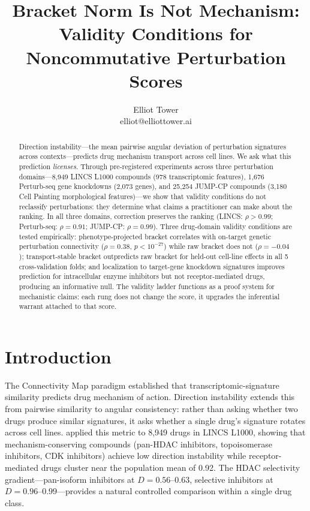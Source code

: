 \documentclass{article}
\title{Bracket Norm Is Not Mechanism:\\ Validity Conditions for Noncommutative Perturbation Scores}
\author{\name Elliot Tower \\
      \email elliot@elliottower.ai}
\begin{document}
\maketitle

\begin{abstract}
Direction instability---the mean pairwise angular deviation of perturbation
signatures across contexts---predicts drug mechanism transport across cell
lines. We ask what this prediction \emph{licenses}. Through pre-registered
experiments across three perturbation domains---8{,}949 LINCS L1000
compounds (978 transcriptomic features), 1{,}676 Perturb-seq gene
knockdowns \citep{replogle2022mapping} (2{,}073 genes), and 25{,}254
JUMP-CP compounds (3{,}180 Cell Painting morphological features)---we show
that validity conditions do not reclassify perturbations: they determine
what claims a practitioner can make about the ranking. In all three domains,
correction preserves the ranking (LINCS: $\rho > 0.99$; Perturb-seq: $\rho
= 0.91$; JUMP-CP: $\rho = 0.99$). Three drug-domain validity conditions
are tested empirically: phenotype-projected bracket correlates with
on-target genetic perturbation connectivity ($\rho = 0.38$, $p < 10^{-27}$)
while raw bracket does not ($\rho = -0.04$); transport-stable bracket
outpredicts raw bracket for held-out cell-line effects in all 5
cross-validation folds; and localization to target-gene knockdown signatures
improves prediction for intracellular enzyme inhibitors but not
receptor-mediated drugs, producing an informative null. The validity
ladder functions as a proof system for mechanistic claims: each rung does not
change the score, it upgrades the inferential warrant attached to that score.
\end{abstract}

\section{Introduction}

The Connectivity Map paradigm \citep{lamb2006connectivity,subramanian2017next}
established that transcriptomic-signature similarity predicts drug mechanism
of action. Direction instability extends this from pairwise similarity to
angular consistency: rather than asking whether two drugs produce similar
signatures, it asks whether a single drug's signature rotates across cell
lines. \citet{tower2026bracket} applied this metric to 8{,}949 drugs in
LINCS L1000, showing that mechanism-conserving compounds (pan-HDAC
inhibitors, topoisomerase inhibitors, CDK inhibitors) achieve low direction
instability while receptor-mediated drugs cluster near the population mean
of 0.92. The HDAC selectivity gradient---pan-isoform
inhibitors at $D = 0.56$--$0.63$, selective inhibitors at $D = 0.96$--$0.99$---provides
a natural controlled comparison within a single drug class.
\end{document}
